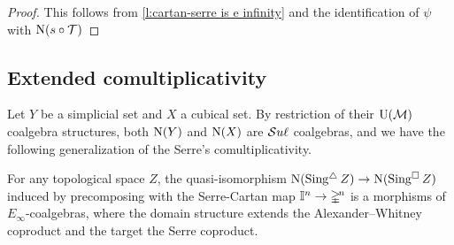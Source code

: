 \begin{proof}
	This follows from \cref{l:cartan-serre is e infinity} and the identification of $\psi$ with $\operatorname{N}(s \circ \mathcal T)$
\end{proof}

\subsection{Extended comultiplicativity} \label{ss:extended comultiplicativity}

Let $Y$ be a simplicial set and $X$ a cubical set.
By restriction of their ${\operatorname{U}(\mathcal{M})}$ coalgebra structures, both $\operatorname{N}(Y)$ and $\operatorname{N}(X)$ are $\mathcal{S}u\ell$ coalgebras, and we have the following generalization of the Serre's comultiplicativity.

\begin{theorem} \label{t:extended comultiplicativity}
	For any topological space $Z$, the quasi-isomorphism $\operatorname{N}(\operatorname{Sing^{\triangle}} Z) \to \operatorname{N}(\operatorname{Sing^{\square}} Z)$ induced by precomposing with the Serre-Cartan map $\mathbb{I}^n \to \mathbb{\Delta}^{\!n}$ is a morphisms of $E_\infty$-coalgebras, where the domain structure extends the Alexander--Whitney coproduct and the target the Serre coproduct.
\end{theorem}

%
